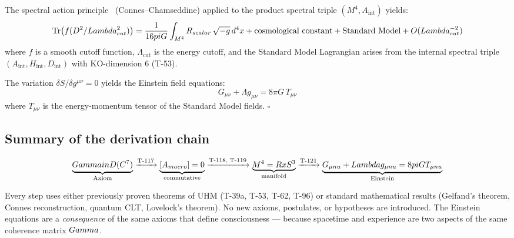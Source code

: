 The spectral action principle~\cite{chamseddine1997} (Connes--Chamseddine) applied to the product spectral triple
$(M^4, A_{\mathrm{int}})$ yields:
\begin{equation}
  \Tr\bigl(f(D^2/Lambda_{cut}^2)\bigr)
  = \frac{1}{16pi G}\int_{M^4} R_{scalar}\,\sqrt{-g}\,d^4x
  + \text{cosmological constant}
  + \text{Standard Model}
  + O(Lambda_{cut}^{-2})
  \label{eq:spectral-action}
\end{equation}
where $f$ is a smooth cutoff function, $\Lambda_{\mathrm{cut}}$ is the energy cutoff,
and the Standard Model Lagrangian arises from the internal spectral triple
$(A_{\mathrm{int}}, H_{\mathrm{int}}, D_{\mathrm{int}})$ with KO-dimension 6 (T-53).

The variation $\delta S / \delta g^{\mu\nu} = 0$ yields the Einstein field equations:
\begin{equation}
  G_{\mu\nu} + \Lambda g_{\mu\nu} = 8\pi G\, T_{\mu\nu}
  \label{eq:einstein-equations}
\end{equation}
where $T_{\mu\nu}$ is the energy-momentum tensor of the Standard Model fields. $\square$

\subsection{Summary of the derivation chain}

\begin{equation}
  \underbrace{Gamma in D(C^7)}_{\text{Axiom}}
  \xrightarrow{\text{T-117}}
  \underbrace{[A_{macro}] = 0}_{\text{commutative}}
  \xrightarrow{\text{T-118, T-119}}
  \underbrace{M^4 = R x S^3}_{\text{manifold}}
  \xrightarrow{\text{T-121}}
  \underbrace{G_{\mu nu} + Lambda g_{\mu nu} = 8pi G T_{\mu nu}}_{\text{Einstein}}
  \label{eq:derivation-chain}
\end{equation}

Every step uses either previously proven theorems of UHM (T-39a, T-53, T-62, T-96) or
standard mathematical results (Gelfand's theorem, Connes reconstruction, quantum CLT,
Lovelock's theorem). No new axioms, postulates, or hypotheses are introduced. The Einstein
equations are a \emph{consequence} of the same axioms that define consciousness ---
because spacetime and experience are two aspects of the same coherence matrix $Gamma$.
